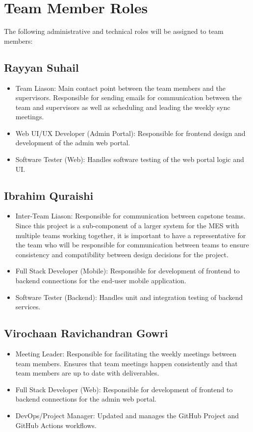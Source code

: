 \documentclass{article}
\begin{document}
\section{Team Member Roles}

\begin{flushleft}
The following administrative and technical roles will be assigned to team members:

\subsection{Rayyan Suhail}
\begin{itemize}
  \item Team Liason: Main contact point between the team members and the supervisors.
  Responsible for sending emails for communication between the team and supervisors as well as scheduling and leading the weekly sync meetings.
  \item Web UI/UX Developer (Admin Portal): Responsible for frontend design and development of the admin web portal.
  \item Software Tester (Web): Handles software testing of the web portal logic and UI.
\end{itemize}

\subsection{Ibrahim Quraishi}
\begin{itemize}
  \item Inter-Team Liason: Responsible for communication between capstone teams.
  Since this project is a sub-component of a larger system for the MES with multiple teams working together, it is important to have a representative for the team who will be responsible for communication between teams to ensure consistency and compatibility between design decisions for the project.
  \item Full Stack Developer (Mobile): Responsible for development of frontend to backend connections for the end-user mobile application.
  \item Software Tester (Backend): Handles unit and integration testing of backend services.
\end{itemize}

\subsection{Virochaan Ravichandran Gowri}
\begin{itemize}
  \item Meeting Leader: Responsible for facilitating the weekly meetings between team members.
  Ensures that team meetings happen consistently and that team members are up to date with deliverables.
  \item Full Stack Developer (Web): Responsible for development of frontend to backend connections for the admin web portal.
  \item DevOps/Project Manager: Updated and manages the GitHub Project and GitHub Actions workflows.
\end{itemize}


\end{flushleft}
\end{document}
